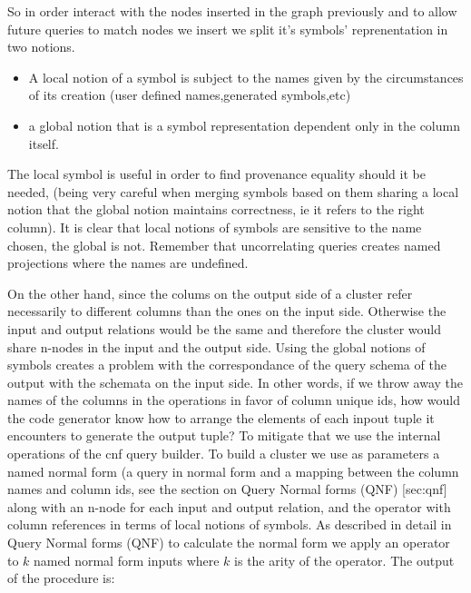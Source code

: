 So in order interact with the nodes inserted in the graph
previously and to allow future queries to match nodes we insert we
split it's symbols' reprenentation in two notions.

\begin{itemize}
\item A local notion of a symbol is subject to the names given by the
  circumstances of its creation (user defined names,generated
  symbols,etc)
\item a global notion that is a symbol representation dependent only in
  the column itself.
\end{itemize}

The local symbol is useful in order to find provenance equality
should it be needed, (being very careful when merging symbols based
on them sharing a local notion that the global notion maintains
correctness, ie it refers to the right column). It is clear that
local notions of symbols are sensitive to the name chosen, the
global is not. Remember that uncorrelating queries creates named
projections where the names are undefined.

On the other hand, since the colums on the output side of a cluster
refer necessarily to different columns than the ones on the input
side. Otherwise the input and output relations would be the same and
therefore the cluster would share n-nodes in the input and the output
side. Using the global notions of symbols creates a problem with the
correspondance of the query schema of the output with the schemata on
the input side. In other words, if we throw away the names of the
columns in the operations in favor of column unique ids, how would the
code generator know how to arrange the elements of each inpout tuple
it encounters to generate the output tuple? To mitigate that we use
the internal operations of the cnf query builder. To build a cluster
we use as parameters a named normal form (a query in normal form and a
mapping between the column names and column ids, see the section on
Query Normal forms (QNF) [sec:qnf] along with an n-node for each input
and output relation, and the operator with column references in terms
of local notions of symbols. As described in detail in Query Normal
forms (QNF) to calculate the normal form we apply an operator to \(k\)
named normal form inputs where \(k\) is the arity of the operator. The
output of the procedure is:

